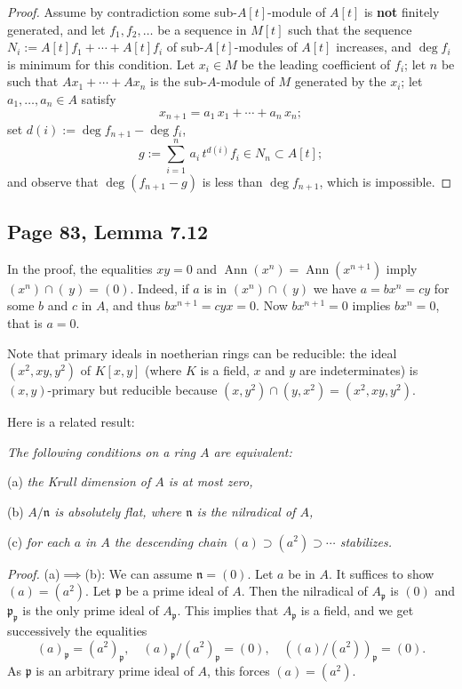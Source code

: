 \documentclass[parskip=half,fontsize=12pt]{scrartcl}%
\newcommand{\oo}{\operatorname}\newcommand{\ooo}{\operatorname*}
\newcommand{\mf}{\mathfrak}
\newcommand{\nnn}{\mf n}
\newcommand{\ppp}{\mf p}
\begin{document}
\begin{proof}
Assume by contradiction some sub-$A[t]$-module of $A[t]$ is \textbf{not} finite\-ly generated, and let $f_1,f_2,\dots$ be a sequence in $M[t]$ such that the sequence $N_i:=A[t]f_1+\cdots+A[t]f_i$ of sub-$A[t]$-modules of $A[t]$ increases, and $\deg f_i$ is minimum for this condition. Let $x_i\in M$ be the leading coefficient of $f_i$; let $n$ be such that $Ax_1+\cdots+Ax_n$ is the sub-$A$-module of $M$ generated by the $x_i$; let $a_1,\dots,a_n\in A$ satisfy 
$$
x_{n+1}=a_1\,x_1+\cdots+a_n\,x_n;
$$ 
set $d(i):=\deg f_{n+1}-\deg f_i$, 
$$
g:=\sum_{i=1}^n\,a_i\,t^{d(i)}f_i\in N_n\subset A[t];
$$ 
and observe that $\deg(f_{n+1}-g)$ is less than $\deg f_{n+1}$, which is impossible.
\end{proof}

\subsection{Page 83, Lemma 7.12}%

In the proof, the equalities $xy=0$ and $\oo{Ann}(x^n)=\oo{Ann}(x^{n+1})$ imply $(x^n)\cap(\,y)=(0)$. Indeed, if $a$ is in $(x^n)\cap(\,y)$ we have $a=bx^n=cy$ for some $b$ and $c$ in $A$, and thus $bx^{n+1}=cyx=0$. Now $bx^{n+1}=0$ implies $bx^n=0$, that is $a=0$. 

Note that primary ideals in noetherian rings can be reducible: the ideal $(x^2,xy,y^2)$ of $K[x,y]$ (where $K$ is a field, $x$ and $y$ are indeterminates) is $(x,y)$-primary but reducible because $(x,y^2)\cap(y,x^2)=(x^2,xy,y^2)$. 


Here is a related result:

\emph{The following conditions on a ring $A$ are equivalent:}

(a) \emph{the Krull dimension of $A$ is at most zero,}

(b) \emph{$A/\nnn$ is absolutely flat, where $\nnn$ is the nilradical of $A$,}

(c) \emph{for each $a$ in $A$ the descending chain $(a)\supset(a^2)\supset\cdots$ stabilizes.}

\emph{Proof.} (a)$\implies$(b): We can assume $\nnn=(0)$. Let $a$ be in $A$. It suffices to show $(a)=(a^2)$. Let $\ppp$ be a prime ideal of $A$. Then the nilradical of $A_\ppp$ is $(0)$ and $\ppp_\ppp$ is the only prime ideal of $A_\ppp$. This implies that $A_\ppp$ is a field, and we get successively the equalities 
$$
(a)_\ppp=(a^2)_\ppp,\quad(a)_\ppp/(a^2)_\ppp=(0),\quad((a)/(a^2))_\ppp=(0).
$$ 
As $\ppp$ is an arbitrary prime ideal of $A$, this forces $(a)=(a^2)$.
\end{document}
